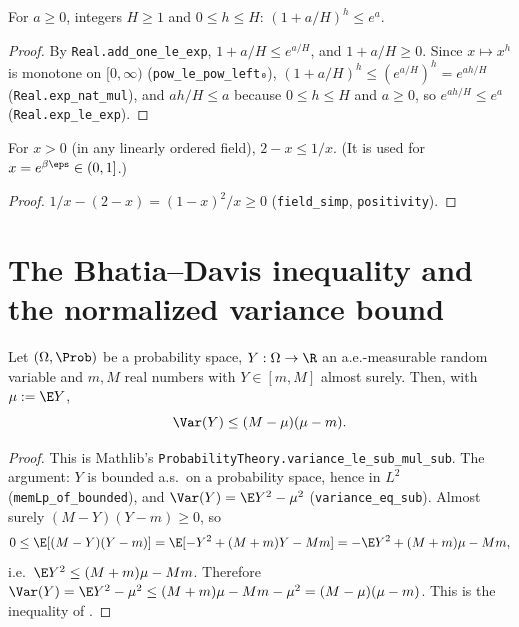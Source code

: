 \begin{lemma}\label{lem:one_add_div_pow_le_exp}
\leanok
For $a \ge 0$, integers $H \ge 1$ and $0 \le h \le H$: $(1 + a/H)^h \le e^{a}$.
\end{lemma}

\begin{proof}
\leanok
By \texttt{Real.add\_one\_le\_exp}, $1 + a/H \le e^{a/H}$, and $1 + a/H \ge 0$. Since
$x \mapsto x^h$ is monotone on $[0, \infty)$ (\texttt{pow\_le\_pow\_left₀}),
$(1 + a/H)^h \le (e^{a/H})^h = e^{ah/H}$ (\texttt{Real.exp\_nat\_mul}), and $ah/H \le a$
because $0 \le h \le H$ and $a \ge 0$, so $e^{ah/H} \le e^{a}$ (\texttt{Real.exp\_le\_exp}).
\end{proof}

\begin{lemma}[{$2 - x \le 1/x$ on $(0, \infty)$}]\label{lem:two_sub_le_inv}
\leanok
For $x > 0$ (in any linearly ordered field), $2 - x \le 1/x$. (It is used for
$x = e^{\beta\eps} \in (0, 1]$.)
\end{lemma}

\begin{proof}
\leanok
$1/x - (2 - x) = (1 - x)^2/x \ge 0$ (\texttt{field\_simp}, \texttt{positivity}).
\end{proof}

\section{The Bhatia--Davis inequality and the normalized variance bound}
\label{sec:pre_analysis_variance}

\begin{lemma}\label{lem:bhatia_davis}
\leanok
Let $(\Omega, \Prob)$ be a probability space, $Y : \Omega \to \R$ an a.e.-measurable random
variable and $m, M$ real numbers with $Y \in [m, M]$ almost surely. Then, with $\mu := \E Y$,
\[
  \Var(Y) \le (M - \mu)(\mu - m) .
\]
\end{lemma}

\begin{proof}
\leanok
This is Mathlib's \texttt{ProbabilityTheory.variance\_le\_sub\_mul\_sub}. The argument:
$Y$ is bounded a.s.\ on a probability space, hence in $L^2$
(\texttt{memLp\_of\_bounded}), and $\Var(Y) = \E Y^2 - \mu^2$ (\texttt{variance\_eq\_sub}).
Almost surely $(M - Y)(Y - m) \ge 0$, so
\[
  0 \le \E[(M - Y)(Y - m)] = \E[-Y^2 + (M + m)Y - Mm] = -\E Y^2 + (M + m)\mu - Mm ,
\]
i.e.\ $\E Y^2 \le (M + m)\mu - Mm$. Therefore
$\Var(Y) = \E Y^2 - \mu^2 \le (M + m)\mu - Mm - \mu^2 = (M - \mu)(\mu - m)$.
This is the inequality of \cite{bhatia2000better}.
\end{proof}

